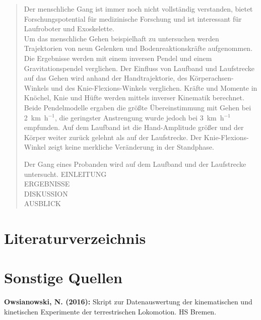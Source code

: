 \documentclass[11pt,captions=tableheading]{scrartcl}
\begin{document}

\setcounter{page}{1}
\tableofcontents
\setcounter{tocdepth}{3}
\clearscrheadfoot
\pagestyle{scrheadings}
\cfoot[]{} 
\ofoot[\pagemark]{\pagemark}
\newpage
{}
\setcounter{page}{1}

\begin{abstract}
	Der menschliche Gang ist immer noch nicht vollständig verstanden, bietet Forschungspotential für medizinische Forschung und ist interessant für Laufroboter und Exoskelette.\\
	Um das menschliche Gehen beispielhaft zu untersuchen werden Trajektorien von neun Gelenken und Bodenreaktionskräfte aufgenommen. Die Ergebnisse werden mit einem inversen Pendel und einem Gravitationspendel verglichen. Der Einfluss von Laufband und Laufstrecke auf das Gehen wird anhand der Handtrajektorie, des Körperachsen-Winkels und des Knie-Flexions-Winkels verglichen. Kräfte und Momente in Knöchel, Knie und Hüfte werden mittels inverser Kinematik berechnet.\\
	Beide Pendelmodelle ergaben die größte Übereinstimmung mit Gehen bei 2~km~h$^{-1}$, die geringster Anstrengung wurde jedoch bei 3~km~h$^{-1}$ empfunden. Auf dem Laufband ist die Hand-Amplitude größer und der Körper weiter zurück gelehnt als auf der Laufstrecke. Der Knie-Flexions-Winkel zeigt keine merkliche Veränderung in der Standphase. 
	
	Der Gang eines Probanden wird auf dem Laufband und der Laufstrecke untersucht. 
	EINLEITUNG\\
	ERGEBNISSE\\
	DISKUSSION\\
	AUSBLICK\\
\end{abstract}





%


\begin{spacing}{1}
\pagestyle{scrheadings}



\renewcommand{\mkbibnamefirst}[1]{\textsc{#1}}
\renewcommand{\mkbibnamelast}[1]{\textsc{#1}}
\renewcommand{\mkbibnameprefix}[1]{\textsc{#1}}
\renewcommand{\mkbibnameaffix}[1]{\textsc{#1}}
\section{Literaturverzeichnis}
\vspace{-29pt}
\printbibliography[title={ .}]
\section{Sonstige Quellen}
\textbf{Owsianowski, N. (2016):} Skript zur Datenauswertung der kinematischen und kinetischen Experimente der terrestrischen Lokomotion. HS Bremen.
\end{spacing}



\end{document}
